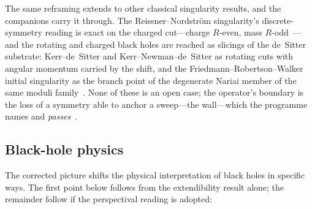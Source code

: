 \documentclass[11pt,a4paper]{article}
\theoremstyle{definition}
\begin{document}
The same reframing extends to other classical singularity results, and the companions carry it through. The Reissner--Nordstr\"om singularity's discrete-symmetry reading is exact on the charged cut---charge $R$-even, mass $R$-odd~\cite{JanzenSlicing}---and the rotating and charged black holes are reached as slicings of the de~Sitter substrate: Kerr--de~Sitter and Kerr--Newman--de~Sitter as rotating cuts with angular momentum carried by the shift, and the Friedmann--Robertson--Walker initial singularity as the branch point of the degenerate Nariai member of the same moduli family~\cite{JanzenRange}. None of these is an open case; the operator's boundary is the loss of a symmetry able to anchor a sweep---the wall---which the programme names and \emph{passes}~\cite{JanzenRange}.

\subsection{Black-hole physics}

The corrected picture shifts the physical interpretation of black holes in specific ways. The first point below follows from the extendibility result alone; the remainder follow if the perspectival reading is adopted:
\end{document}
